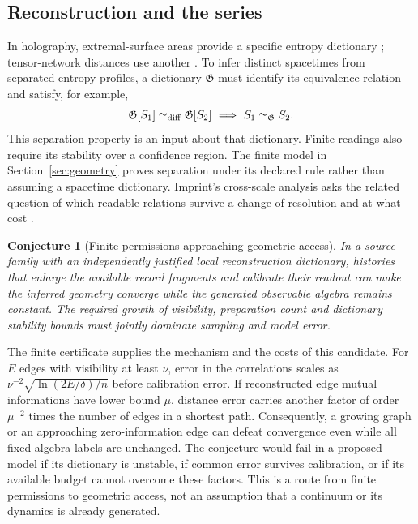 \documentclass[12pt,a4paper]{article}
\newtheorem{conjecture}[theorem]{Conjecture}
\begin{document}
\subsection{Reconstruction and the series}

In holography, extremal-surface areas provide a specific entropy
dictionary \cite{Maldacena1999,RyuTakayanagi2006}; tensor-network
distances use another \cite{Swingle2012}. To infer distinct
spacetimes from separated entropy profiles, a dictionary
$\mathfrak G$ must identify its equivalence relation and satisfy,
for example,
\[
 \mathfrak G[S_1]\simeq_{\rm diff}\mathfrak G[S_2]
       \ \Longrightarrow\ S_1\simeq_{\mathfrak G}S_2 .
\]
This separation property is an input about that dictionary.
Finite readings also require its stability over a confidence
region. The finite model in Section~\ref{sec:geometry} proves
separation under its declared rule rather than assuming a
spacetime dictionary. Imprint's cross-scale analysis asks the related
question of which readable relations survive a change of resolution
and at what cost \cite{LiuImprintRG}.

\begin{conjecture}[Finite permissions approaching geometric access]
\label{conj:finite-geometry}
In a source family with an independently justified local
reconstruction dictionary, histories that enlarge the available
record fragments and calibrate their readout can make the inferred
geometry converge while the generated observable algebra remains
constant. The required growth of visibility, preparation count and
dictionary stability bounds must jointly dominate sampling and
model error.
\end{conjecture}

The finite certificate supplies the mechanism and the costs of this
candidate. For $E$ edges with visibility at least $\nu$, error in
the correlations scales as
$\nu^{-2}\sqrt{\ln(2E/\delta)/n}$ before calibration error.
If reconstructed edge mutual informations have lower bound $\mu$,
distance error carries another factor of order $\mu^{-2}$ times
the number of edges in a shortest path. Consequently, a growing
graph or an approaching zero-information edge can defeat
convergence even while all fixed-algebra labels are unchanged.
The conjecture would fail in a proposed model if its dictionary is
unstable, if common error survives calibration, or if its available
budget cannot overcome these factors. This is a route from finite
permissions to geometric access, not an assumption that a continuum
or its dynamics is already generated.
\end{document}
